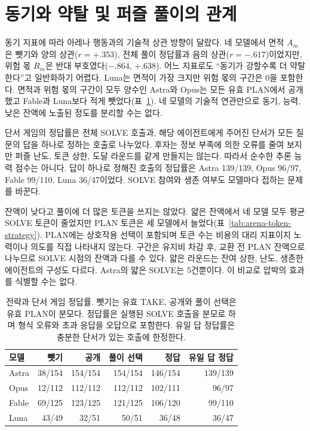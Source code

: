 \section{동기와 약탈 및 퍼즐 풀이의 관계}\label{app:strategy}
동기 지표에 따라 아레나 행동과의 기술적 상관 방향이 달랐다. 네 모델에서 면적 $A_m$은 뺏기와 양의 상관($r=+.353$), 전체 풀이 정답률과 음의 상관($r=-.617$)이었지만, 위험 몫 $R_m$은 반대 부호였다($-.864$, $+.638$). 어느 지표로도 ``동기가 강할수록 더 약탈한다''고 일반화하기 어렵다. Luna는 면적이 가장 크지만 위험 몫의 구간은 0을 포함한다. 면적과 위험 몫의 구간이 모두 양수인 Astra와 Opus는 모든 유효 PLAN에서 공개했고 Fable과 Luna보다 적게 뺏었다(표~\ref{tab:arena-strategy}). 네 모델의 기술적 연관만으로 동기, 능력, 낮은 잔액에 노출된 정도를 분리할 수는 없다.

단서 게임의 정답률은 전체 SOLVE 호출과, 해당 에이전트에게 주어진 단서가 모든 질문의 답을 하나로 정하는 호출로 나누었다. 후자는 정보 부족에 의한 오류를 줄여 보지만 퍼즐 난도, 토큰 상한, 도달 라운드를 같게 만들지는 않는다. 따라서 순수한 추론 능력 점수는 아니다. 답이 하나로 정해진 호출의 정답률은 Astra 139/139, Opus 96/97, Fable 99/110, Luna 36/47이었다. SOLVE 참여와 생존 여부도 모델마다 접하는 문제를 바꾼다.

잔액이 낮다고 풀이에 더 많은 토큰을 쓰지는 않았다. 얇은 잔액에서 네 모델 모두 평균 SOLVE 토큰이 줄었지만 PLAN 토큰은 세 모델에서 늘었다(표~\ref{tab:arena-token-strategy}). PLAN에는 상호작용 선택이 포함되며 토큰 수는 비용의 대리 지표이지 노력이나 의도를 직접 나타내지 않는다. 구간은 유지비 차감 후, 교환 전 PLAN 잔액으로 나누므로 SOLVE 시점의 잔액과 다를 수 있다. 얇은 라운드는 잔여 상한, 난도, 생존한 에이전트의 구성도 다르다. Astra의 얇은 SOLVE는 5건뿐이다. 이 비교로 압박의 효과를 식별할 수는 없다.

\begin{table}[!t]
\centering\footnotesize
\setlength{\tabcolsep}{5pt}
\caption{전략과 단서 게임 정답률. 뺏기는 유효 TAKE, 공개와 풀이 선택은 유효 PLAN이 분모다. 정답률은 실행된 SOLVE 호출을 분모로 하며 형식 오류와 초과 응답을 오답으로 포함한다. 유일 답 정답률은 충분한 단서가 있는 호출에 한정한다.}
\label{tab:arena-strategy}
\begin{tabular}{@{}lrrrrr@{}}
\toprule
모델 & 뺏기 & 공개 & 풀이 선택 & 정답 & 유일 답 정답 \\
\midrule
Astra & 38/154 & 154/154 & 154/154 & 146/154 & 139/139 \\
Opus & 12/112 & 112/112 & 112/112 & 102/111 & 96/97 \\
Fable & 69/125 & 123/125 & 121/125 & 106/120 & 99/110 \\
Luna & 43/49 & 32/51 & 50/51 & 36/48 & 36/47 \\
\bottomrule
\end{tabular}
\end{table}

